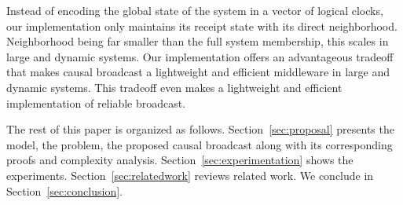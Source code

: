 Instead of encoding the global state of the system in a vector of logical
clocks, our implementation only maintains its receipt state with its direct
neighborhood. Neighborhood being far smaller than the full system membership,
this scales in large and dynamic systems.  Our implementation offers an
advantageous tradeoff that makes causal broadcast a lightweight and efficient
middleware in large and dynamic systems. This tradeoff even makes a lightweight
and efficient implementation of reliable broadcast.

The rest of this paper is organized as follows. 
Section~\ref{sec:proposal} presents the model, the problem, the proposed causal
broadcast along with its corresponding proofs and complexity
analysis. Section~\ref{sec:experimentation} shows the
experiments. Section~\ref{sec:relatedwork} reviews related work. We conclude in
Section~\ref{sec:conclusion}.


